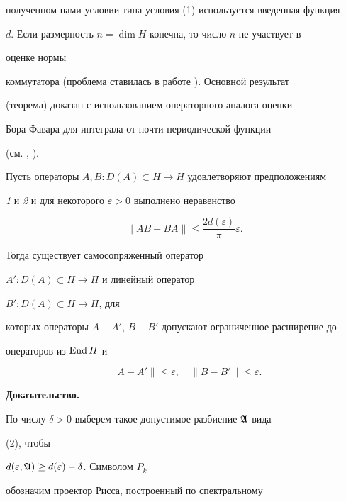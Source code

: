 полученном нами условии типа условия (1) используется введенная функция


$d$. Если размерность $n=\dim H$ конечна, то число $n$ не участвует в


оценке нормы


коммутатора (проблема ставилась в работе \cite{Pea}). Основной результат


(теорема) доказан с использованием операторного аналога оценки


Бора-Фавара для интеграла от почти периодической функции


(см. \cite{Bas1}, \cite{Bas2}).





\begin{thmnonum}


Пусть операторы $A,B:D(A)\subset H\to H$ удовлетворяют предположениям


{\em 1} и {\em 2} и для некоторого $\varepsilon>0$ выполнено неравенство


\begin{equation}


\|AB-BA\|\le\frac{2d(\varepsilon)}{\pi}\varepsilon.


\end{equation}


Тогда существует самосопряженный оператор


$A':D(A)\subset H\to H$ и линейный оператор


$B':D(A)\subset H\to H$, для


которых операторы $A-A'$, $B-B'$ допускают ограниченное расширение до


операторов из $\operatorname{End} H$ и


$$


\|A-A'\|\le\varepsilon,\quad


\|B-B'\|\le \varepsilon.


$$


\end{thmnonum}





{\bf Доказательство.}


По числу $\delta>0$ выберем такое допустимое разбиение $\frak A$ вида


(2), чтобы


$d(\varepsilon,\frak A)\ge d(\varepsilon)-\delta$. Символом $P_k$


обозначим проектор Рисса, построенный по спектральному



